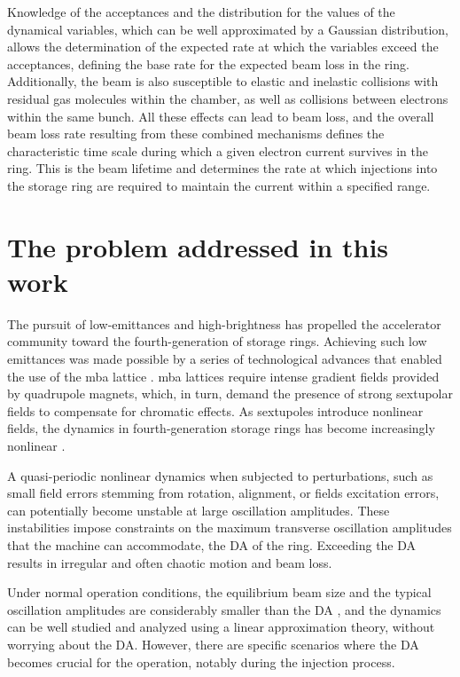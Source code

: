 Knowledge of the acceptances and the distribution for the values of the dynamical variables, which can be well approximated  by a Gaussian distribution, allows the determination of the expected rate at which the variables exceed the acceptances, defining the base rate for the expected beam loss in the ring. Additionally, the beam is also susceptible to elastic and inelastic collisions with residual gas molecules within the chamber, as well as collisions between electrons within the same bunch. All these effects can lead to beam loss, and the overall beam loss rate resulting from these combined mechanisms defines the characteristic time scale during which a given electron current survives in the ring. This is the beam lifetime and determines the rate at which injections into the storage ring are required to maintain the current within a specified range.

\section*{The problem addressed in this work}

The pursuit of low-emittances and high-brightness has propelled the accelerator community toward the fourth-generation of storage rings. Achieving such low emittances was made possible by a series of technological advances that enabled the use of the \gls*{mba} lattice \cite{liu_towards_2017,hettel_challenges_2014}. \gls*{mba} lattices require intense gradient fields provided by quadrupole magnets, which, in turn, demand the presence of strong sextupolar fields to compensate for chromatic effects. As sextupoles introduce nonlinear fields, the dynamics in fourth-generation storage rings has become increasingly nonlinear \cite{liu_towards_2017}.

A quasi-periodic nonlinear dynamics when subjected to perturbations, such as small field errors stemming from rotation, alignment, or fields excitation errors, can potentially become unstable at large oscillation amplitudes. These instabilities impose constraints on the maximum transverse oscillation amplitudes that the machine can accommodate, the \gls*{DA} of the ring. Exceeding the \gls*{DA} results in irregular and often chaotic motion and beam loss.

Under normal operation conditions, the equilibrium beam size and the typical oscillation amplitudes are considerably smaller than the \gls*{DA} , and the dynamics can be well studied and analyzed using a linear approximation theory, without worrying about the \gls*{DA}. However, there are specific scenarios where the \gls*{DA} becomes crucial for the operation, notably during the injection process.

